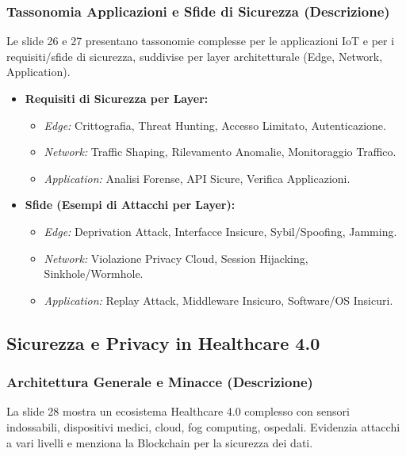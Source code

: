 \documentclass{article}
\begin{document}
\subsubsection{Tassonomia Applicazioni e Sfide di Sicurezza (Descrizione)}
Le slide 26 e 27 presentano tassonomie complesse per le applicazioni IoT e per i requisiti/sfide di sicurezza, suddivise per layer architetturale (Edge, Network, Application).
\begin{itemize}
    \item \textbf{Requisiti di Sicurezza per Layer:}
    \begin{itemize}
        \item \textit{Edge:} Crittografia, Threat Hunting, Accesso Limitato, Autenticazione.
        \item \textit{Network:} Traffic Shaping, Rilevamento Anomalie, Monitoraggio Traffico.
        \item \textit{Application:} Analisi Forense, API Sicure, Verifica Applicazioni.
    \end{itemize}
    \item \textbf{Sfide (Esempi di Attacchi per Layer):}
    \begin{itemize}
        \item \textit{Edge:} Deprivation Attack, Interfacce Insicure, Sybil/Spoofing, Jamming.
        \item \textit{Network:} Violazione Privacy Cloud, Session Hijacking, Sinkhole/Wormhole.
        \item \textit{Application:} Replay Attack, Middleware Insicuro, Software/OS Insicuri.
    \end{itemize}
\end{itemize}

\subsection{Sicurezza e Privacy in Healthcare 4.0}

\subsubsection{Architettura Generale e Minacce (Descrizione)}
La slide 28 mostra un ecosistema Healthcare 4.0 complesso con sensori indossabili, dispositivi medici, cloud, fog computing, ospedali. Evidenzia attacchi a vari livelli e menziona la Blockchain per la sicurezza dei dati.
\end{document}
